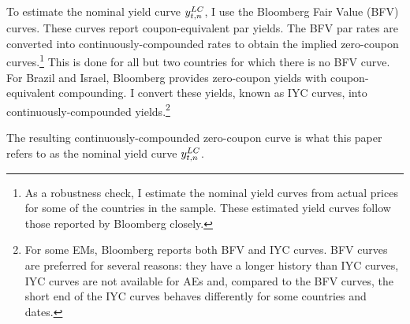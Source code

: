 {To estimate the nominal yield curve $y_{t,n} ^{LC}$, I use the Bloomberg Fair Value (BFV) curves.
These curves report coupon-equivalent par yields. 
The BFV par rates are converted into continuously-compounded rates
\citep*[see][]{GSW:2007} to obtain the implied zero-coupon curves.\footnote{As a robustness check, I estimate the nominal yield curves from actual prices for some of the countries in the sample. These estimated yield curves follow those reported by Bloomberg closely.} This is done for all but two countries for which there is no BFV curve.
For Brazil and Israel, Bloomberg provides zero-coupon yields with coupon-equivalent compounding.
I convert these yields, known as IYC curves, into continuously-compounded yields.\footnote{ For some EMs, Bloomberg reports both BFV and IYC curves. BFV curves are preferred for several reasons: they have a longer history than IYC curves, IYC curves are not available for AEs and, compared to the BFV curves, the short end of the IYC curves behaves differently for some countries and dates.} 

The resulting continuously-compounded zero-coupon curve is what this paper refers to as the nominal yield curve \(y_{t,n} ^{LC}\).


}
